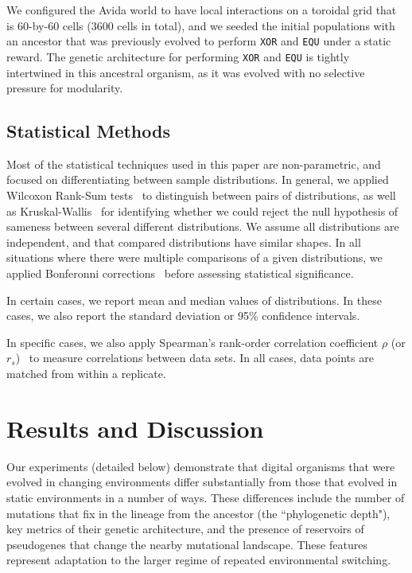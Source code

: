 \documentclass[10pt,letterpaper]{article}
\begin{document}
We configured the Avida world to have local interactions on a toroidal grid that is 60-by-60 cells (3600 cells in total), and we seeded the initial populations with an ancestor that was previously evolved to perform \texttt{XOR} and \texttt{EQU} under a static reward. The genetic architecture for performing \texttt{XOR} and \texttt{EQU} is tightly intertwined in this ancestral organism, as it was evolved with no selective pressure for modularity.

\subsection*{Statistical Methods}
Most of the statistical techniques used in this paper are non-parametric, and focused on differentiating between sample distributions. In general, we applied Wilcoxon Rank-Sum tests~\cite{wilcoxon_individual_1945} to distinguish between pairs of distributions, as well as Kruskal-Wallis~\cite{kruskal_use_1952} for identifying whether we could reject the null hypothesis of sameness between several different distributions. We assume all distributions are independent, and that compared distributions have similar shapes. In all situations where there were multiple comparisons of a given distributions, we applied Bonferonni corrections~\cite{rice_analyzing_1989} before assessing statistical significance. 

In certain cases, we report mean and median values of distributions. In these cases, we also report the standard deviation or 95\% confidence intervals.

In specific cases, we also apply Spearman's rank-order correlation coefficient $\rho$ (or $r_{s}$)~\cite{spearman_proof_1904} to measure correlations between data sets. In all cases, data points are matched from within a replicate.

\section*{Results and Discussion}
Our experiments (detailed below) demonstrate that digital organisms that were evolved in changing environments differ substantially from those that evolved in static environments in a number of ways. These differences include the number of mutations that fix in the lineage from the ancestor (the ``phylogenetic depth"), key metrics of their genetic architecture, and the presence of reservoirs of pseudogenes that change the nearby mutational landscape. These features represent adaptation to the larger regime of repeated environmental switching. 
\end{document}
